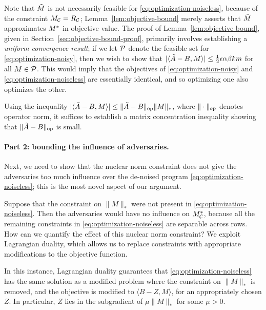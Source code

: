 Note that $\tilde{M}$ is not necessarily feasible for \eqref{eq:optimization-noiseless}, 
because of the constraint $M_{\mathcal{C}} = R_{\mathcal{C}}$; Lemma~\ref{lem:objective-bound} 
merely asserts that $\tilde{M}$ approximates $M^*$ in objective value. The proof of 
Lemma~\ref{lem:objective-bound}, given in Section~\ref{sec:objective-bound-proof}, 
primarily involves establishing a 
\emph{uniform convergence result}; if we let $\mathcal{P}$ denote the feasible set for 
\eqref{eq:optimization-noisy}, then we wish to show that 
$|\langle \tilde{A} - B, M \rangle| \leq \frac{1}{2}\epsilon \alpha\beta km$ for all 
$M \in \mathcal{P}$. This would imply that the objectives of 
\eqref{eq:optimization-noisy} and \eqref{eq:optimization-noiseless} are 
essentially identical, and so optimizing one also optimizes the other.

Using the inequality $|\langle \tilde{A} - B, M \rangle| \leq \|\tilde{A}-B\|_{\mathrm{op}}\|M\|_*$, 
where $\|\cdot\|_{\mathrm{op}}$ denotes operator norm, it suffices to establish a matrix 
concentration inequality showing that $\|\tilde{A} - B\|_{\mathrm{op}}$ is small. 

\paragraph{Part 2: bounding the influence of adversaries.} 
Next, we need to show that the nuclear norm constraint does 
not give the adversaries too much influence over the de-noised program 
\eqref{eq:optimization-noiseless}; this is the most novel aspect 
of our argument.

Suppose that the constraint on $\|M\|_*$ were not present in 
\eqref{eq:optimization-noiseless}. Then the adversaries would have 
no influence on $M^*_{\mathcal{C}}$, because all the remaining constraints 
in \eqref{eq:optimization-noiseless} are separable across rows. 
How can we quantify the effect of this nuclear norm constraint?
We exploit Lagrangian duality, which allows us to replace constraints 
with appropriate modifications to the objective function.



In this instance, 
Lagrangian duality guarantees that \eqref{eq:optimization-noiseless} has the 
same solution as a modified problem where the constraint on $\|M\|_*$ is removed, 
and the objective is modified to $\langle B - Z, M \rangle$, for an appropriately 
chosen $Z$. In particular, $Z$ lies in the subgradient of 
$\mu \|M\|_*$ for some $\mu > 0$.

